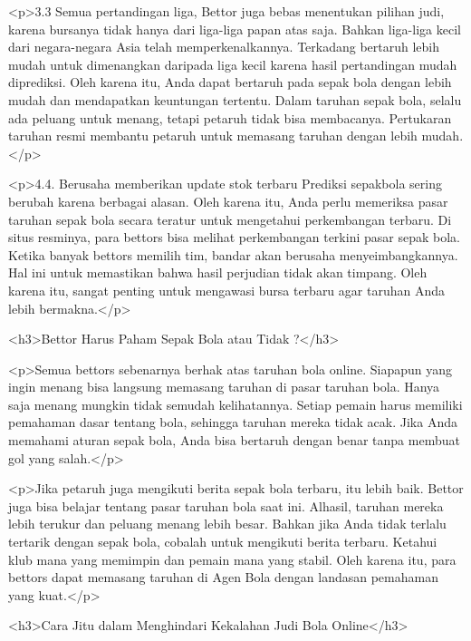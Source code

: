 {<p>3.3 Semua pertandingan liga, Bettor juga bebas menentukan pilihan judi, karena bursanya tidak hanya dari liga-liga papan atas saja. Bahkan liga-liga kecil dari negara-negara Asia telah memperkenalkannya. Terkadang bertaruh lebih mudah untuk dimenangkan daripada liga kecil karena hasil pertandingan mudah diprediksi. Oleh karena itu, Anda dapat bertaruh pada sepak bola dengan lebih mudah dan mendapatkan keuntungan tertentu. Dalam taruhan sepak bola, selalu ada peluang untuk menang, tetapi petaruh tidak bisa membacanya. Pertukaran taruhan resmi membantu petaruh untuk memasang taruhan dengan lebih mudah.</p>



<p>4.4. Berusaha memberikan update stok terbaru Prediksi sepakbola sering berubah karena berbagai alasan. Oleh karena itu, Anda perlu memeriksa pasar taruhan sepak bola secara teratur untuk mengetahui perkembangan terbaru. Di situs resminya, para bettors bisa melihat perkembangan terkini pasar sepak bola. Ketika banyak bettors memilih tim, bandar akan berusaha menyeimbangkannya. Hal ini untuk memastikan bahwa hasil perjudian tidak akan timpang. Oleh karena itu, sangat penting untuk mengawasi bursa terbaru agar taruhan Anda lebih bermakna.</p>



<h3>Bettor Harus Paham Sepak Bola atau Tidak ?</h3>



<p>Semua bettors sebenarnya berhak atas taruhan bola online. Siapapun yang ingin menang bisa langsung memasang taruhan di pasar taruhan bola. Hanya saja menang mungkin tidak semudah kelihatannya. Setiap pemain harus memiliki pemahaman dasar tentang bola, sehingga taruhan mereka tidak acak. Jika Anda memahami aturan sepak bola, Anda bisa bertaruh dengan benar tanpa membuat gol yang salah.</p>



<p>Jika petaruh juga mengikuti berita sepak bola terbaru, itu lebih baik. Bettor juga bisa belajar tentang pasar taruhan bola saat ini. Alhasil, taruhan mereka lebih terukur dan peluang menang lebih besar. Bahkan jika Anda tidak terlalu tertarik dengan sepak bola, cobalah untuk mengikuti berita terbaru. Ketahui klub mana yang memimpin dan pemain mana yang stabil. Oleh karena itu, para bettors dapat memasang taruhan di Agen Bola dengan landasan pemahaman yang kuat.</p>



<h3>Cara Jitu dalam Menghindari Kekalahan Judi Bola Online</h3>



}
